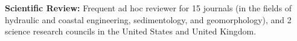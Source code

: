 \listing
{\bf Scientific Review:} Frequent ad hoc reviewer for 15 journals (in the fields of hydraulic and coastal engineering, sedimentology, and geomorphology), and 2 science research councils in the United States and United Kingdom.







